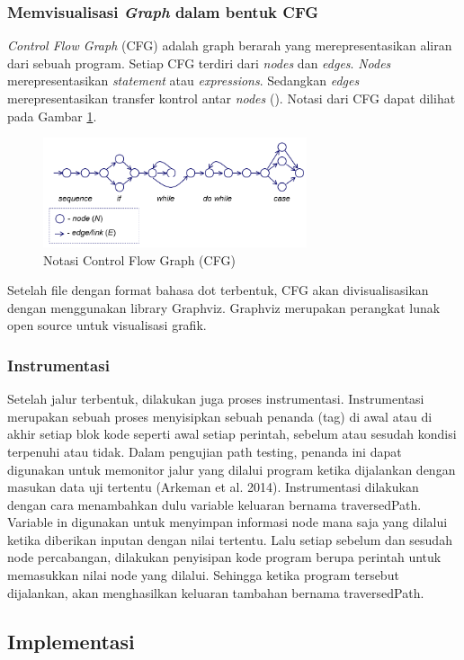 \subsubsection*{Memvisualisasi \textit{Graph} dalam bentuk CFG}
\textit{Control Flow Graph }(CFG) adalah graph berarah yang merepresentasikan aliran dari sebuah program. Setiap CFG terdiri dari \textit{nodes} dan \textit{edges}. \textit{Nodes} merepresentasikan \textit{statement} atau \textit{expressions}. Sedangkan \textit{edges} merepresentasikan transfer kontrol antar \textit{nodes} (\cite{MCCABE}). Notasi dari CFG dapat dilihat pada Gambar \ref{fig:cfg}.
\begin{figure}[h]
	\centering
	\includegraphics[width=220pt]{gambar/CFG2}
	\caption{Notasi Control Flow Graph (CFG)}
	\label{fig:cfg}
\end{figure}
Setelah file dengan format bahasa dot terbentuk, CFG akan divisualisasikan dengan menggunakan library Graphviz. Graphviz merupakan perangkat lunak open source untuk visualisasi grafik. 

\subsubsection*{Instrumentasi}
Setelah jalur terbentuk, dilakukan juga proses instrumentasi. Instrumentasi merupakan sebuah proses menyisipkan sebuah penanda (tag) di awal atau di akhir setiap blok kode seperti awal setiap perintah, sebelum atau sesudah kondisi terpenuhi atau tidak. Dalam pengujian path testing, penanda ini dapat digunakan untuk memonitor jalur yang dilalui program ketika dijalankan dengan masukan data uji tertentu (Arkeman et al. 2014). 
Instrumentasi dilakukan dengan cara menambahkan dulu variable keluaran bernama traversedPath. Variable in digunakan untuk menyimpan informasi node mana saja yang dilalui ketika diberikan inputan dengan nilai tertentu. Lalu setiap sebelum dan sesudah node percabangan, dilakukan penyisipan kode program berupa perintah untuk memasukkan nilai node yang dilalui. Sehingga ketika program tersebut dijalankan, akan menghasilkan keluaran tambahan bernama traversedPath. 

\subsection*{Implementasi}

